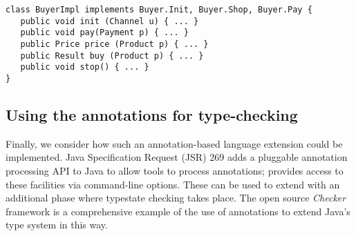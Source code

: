 \begin{lstlisting}
class BuyerImpl implements Buyer.Init, Buyer.Shop, Buyer.Pay {
   public void init (Channel u) { ... }
   public void pay(Payment p) { ... }
   public Price price (Product p) { ... }
   public Result buy (Product p) { ... }
   public void stop() { ... }
}
\end{lstlisting}

\subsection{Using the annotations for type-checking}

Finally, we consider how such an annotation-based language extension
could be implemented. Java Specification Request (JSR) 269
\cite{jsr269} adds a pluggable annotation processing API to Java to
allow tools to process annotations;  provides access to
these facilities via command-line options. These can be used to extend
 with an additional phase where typestate checking takes
place. The open source \emph{Checker} framework \cite{papi08,dietl11}
is a comprehensive example of the use of annotations to extend Java's
type system in this way.
